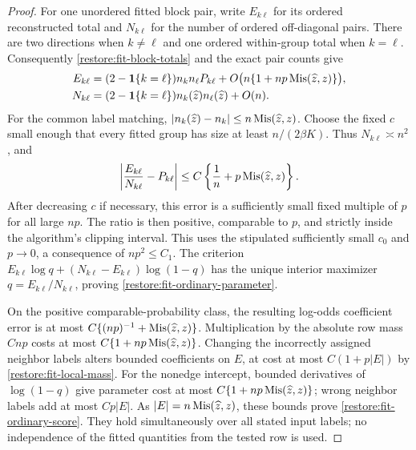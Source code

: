 \begin{proof}
For one unordered fitted block pair, write $E_{k\ell}$ for its ordered
reconstructed total and $N_{k\ell}$ for the number of ordered
 off-diagonal pairs. There are two directions when $k\ne\ell$ and
one ordered within-group total when $k=\ell$. Consequently
\cref{restore:fit-block-totals} and the exact pair counts give
\[
 \begin{aligned}
 E_{k\ell}
 &=(2-\mathbf1\{k=\ell\})n_kn_\ell P_{k\ell}
        +O\bigl(n\{1+np\operatorname{Mis}(\widehat z,z)\}\bigr),\\
 N_{k\ell}
 &=(2-\mathbf1\{k=\ell\})n_k(\widehat z)n_\ell(\widehat z)+O(n).
 \end{aligned}
\]
For the common label matching,
$|n_k(\widehat z)-n_k|\le n\operatorname{Mis}(\widehat z,z)$.
Choose the fixed $c$ small enough that every fitted group has size
at least $n/(2\beta K)$. Thus $N_{k\ell}\asymp n^2$, and
\[
 \left|\frac{E_{k\ell}}{N_{k\ell}}-P_{k\ell}\right|
 \le C\left\{\frac1n+p\operatorname{Mis}(\widehat z,z)\right\}.
\]
After decreasing $c$ if necessary, this error is a sufficiently small
fixed multiple of $p$ for all large $np$. The ratio is then positive,
comparable to $p$, and strictly inside the algorithm's clipping
interval. This uses the stipulated sufficiently small $c_0$ and
$p\to0$, a consequence of $np^2\le C_1$.
The criterion $E_{k\ell}\log q+(N_{k\ell}-E_{k\ell})\log(1-q)$
has the unique interior maximizer $q=E_{k\ell}/N_{k\ell}$,
proving \eqref{restore:fit-ordinary-parameter}.

On the positive comparable-probability class, the resulting log-odds
coefficient error is at most
$C\{(np)^{-1}+\operatorname{Mis}(\widehat z,z)\}$.
Multiplication by the absolute row mass $Cnp$ costs at most
$C\{1+np\operatorname{Mis}(\widehat z,z)\}$.
Changing the incorrectly assigned neighbor labels alters bounded
coefficients on $E$, at cost at most $C(1+p|E|)$ by
\cref{restore:fit-local-mass}.
For the nonedge intercept, bounded derivatives of $\log(1-q)$ give
parameter cost at most $C\{1+np\operatorname{Mis}(\widehat z,z)\}$;
wrong neighbor labels add at most $Cp|E|$.
As $|E|=n\operatorname{Mis}(\widehat z,z)$, these bounds prove
\eqref{restore:fit-ordinary-score}. They hold simultaneously over
all stated input labels; no independence of the fitted quantities
from the tested row is used.
\end{proof}

